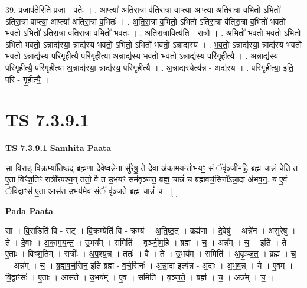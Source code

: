 \documentclass[17pt]{extarticle}
\begin{document}
39. प्र॒जाप॑ते॒रिति॑ प्र॒जा - प॒तेः॒ । . आप्त्या॑ अतिरा॒त्रा व॑तिरा॒त्रा वाप्त्या॒ आप्त्या॑ अतिरा॒त्रा व॒भितो॒ ऽभितो॑ ऽतिरा॒त्रा वाप्त्या॒ आप्त्या॑ अतिरा॒त्रा व॒भितः॑ । . अ॒ति॒रा॒त्रा व॒भितो॒ ऽभितो॑ ऽतिरा॒त्रा व॑तिरा॒त्रा व॒भितो॑ भवतो भवतो॒ ऽभितो॑ ऽतिरा॒त्रा व॑तिरा॒त्रा व॒भितो॑ भवतः । . अ॒ति॒रा॒त्रावित्य॑ति - रा॒त्रौ । . अ॒भितो॑ भवतो भवतो॒ ऽभितो॒ ऽभितो॑ भवतो॒ ऽन्नाद्य॑स्या॒ न्नाद्य॑स्य भवतो॒ ऽभितो॒ ऽभितो॑ भवतो॒ ऽन्नाद्य॑स्य । . भ॒व॒तो॒ ऽन्नाद्य॑स्या॒ न्नाद्य॑स्य भवतो भवतो॒ ऽन्नाद्य॑स्य॒ परि॑गृहीत्यै॒ परि॑गृहीत्या अ॒न्नाद्य॑स्य भवतो भवतो॒ ऽन्नाद्य॑स्य॒ परि॑गृहीत्यै । . अ॒न्नाद्य॑स्य॒ परि॑गृहीत्यै॒ परि॑गृहीत्या अ॒न्नाद्य॑स्या॒ न्नाद्य॑स्य॒ परि॑गृहीत्यै । . अ॒न्नाद्य॒स्येत्य॑न्न - अद्य॑स्य । . परि॑गृहीत्या॒ इति॒ परि॑ - गृ॒ही॒त्यै॒ । \newline
\pagebreak
{}

\section{ TS 7.3.9.1 }

\textbf{TS 7.3.9.1 } \newline
\textbf{Samhita Paata} \newline

सा वि॒राड् वि॒क्रम्या॑तिष्ठ॒द्-ब्रह्म॑णा दे॒वेष्वन्ने॒ना-सु॑रेषु॒ ते दे॒वा अ॑कामयन्तो॒भयꣳ॒॒ सं ॅवृ॑ञ्जीमहि॒ ब्रह्म॒ चान्नं॒ चेति॒ त ए॒ता विꣳ॑श॒तिꣳ रात्री॑रपश्य॒न् ततो॒ वै त उ॒भयꣳ॒॒ सम॑वृञ्जत॒ ब्रह्म॒ चान्नं॑ च ब्रह्मवर्च॒सिनो᳚ऽन्ना॒दा अ॑भव॒न्॒. य ए॒वं ॅवि॒द्वाꣳस॑ ए॒ता आस॑त उ॒भय॑मे॒व संॅ वृ॑ञ्जते॒ ब्रह्म॒ चान्नं॑ च - [  ] \newline

\textbf{Pada Paata} \newline

सा । वि॒राडिति॑ वि - राट् । वि॒क्रम्येति॑ वि - क्रम्य॑ । अ॒ति॒ष्ठ॒त् । ब्रह्म॑णा । दे॒वेषु॑ । अन्ने॑न । असु॑रेषु । ते । दे॒वाः । अ॒का॒म॒य॒न्त॒ । उ॒भय᳚म् । समिति॑ । वृ॒ञ्जी॒म॒हि॒ । ब्रह्म॑ । च॒ । अन्न᳚म् । च॒ । इति॑ । ते । ए॒ताः । विꣳ॒॒श॒तिम् । रात्रीः᳚ । अ॒प॒श्य॒न्न् । ततः॑ । वै । ते । उ॒भय᳚म् । समिति॑ । अ॒वृ॒ञ्ज॒त॒ । ब्रह्म॑ । च॒ । अन्न᳚म् । च॒ । ब्र॒ह्म॒व॒र्च॒सिन॒ इति॑ ब्रह्म - व॒र्च॒सिनः॑ । अ॒न्ना॒दा इत्य॑न्न - अ॒दाः । अ॒भ॒व॒न्न् । ये । ए॒वम् । वि॒द्वाꣳसः॑ । ए॒ताः । आस॑ते । उ॒भय᳚म् । ए॒व । समिति॑ । वृ॒ञ्ज॒ते॒ । ब्रह्म॑ । च॒ । अन्न᳚म् । च॒ ।  \newline
\end{document}
